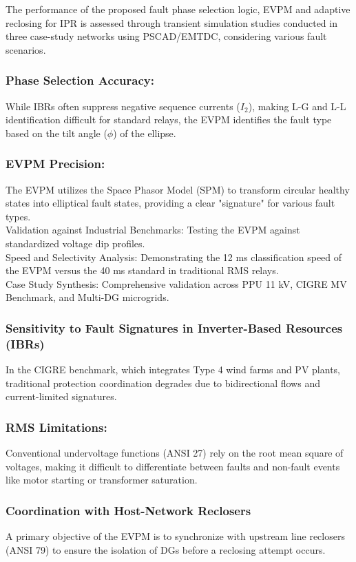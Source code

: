 The performance of the proposed fault phase selection logic, EVPM and adaptive reclosing for IPR is assessed through transient simulation studies conducted in three case-study networks using PSCAD/EMTDC, considering various fault scenarios.




\subsubsection{Phase Selection Accuracy:}
While IBRs often suppress negative sequence currents ($I_2$), making L-G and L-L identification difficult for standard relays, the EVPM identifies the fault type based on the tilt angle ($\phi$) of the ellipse.

\subsubsection{EVPM Precision:}
The EVPM utilizes the Space Phasor Model (SPM) to transform circular healthy states into elliptical fault states, providing a clear "signature" for various fault types.\\
 Validation against Industrial Benchmarks: Testing the EVPM against standardized voltage dip profiles.\\
 Speed and Selectivity Analysis: Demonstrating the 12 ms classification speed of the EVPM versus the 40 ms standard in traditional RMS relays.\\
 Case Study Synthesis: Comprehensive validation across PPU 11 kV, CIGRE MV Benchmark, and Multi-DG microgrids.\\
\subsubsection{Sensitivity to Fault Signatures in Inverter-Based Resources (IBRs)}
In the CIGRE benchmark, which integrates Type 4 wind farms and PV plants, traditional protection coordination degrades due to bidirectional flows and current-limited signatures.
\subsubsection{RMS Limitations:}
Conventional undervoltage functions (ANSI 27) rely on the root mean square of voltages, making it difficult to differentiate between faults and non-fault events like motor starting or transformer saturation.
\subsubsection{Coordination with Host-Network Reclosers}
A primary objective of the EVPM is to synchronize with upstream line reclosers (ANSI 79) to ensure the isolation of DGs before a reclosing attempt occurs.
